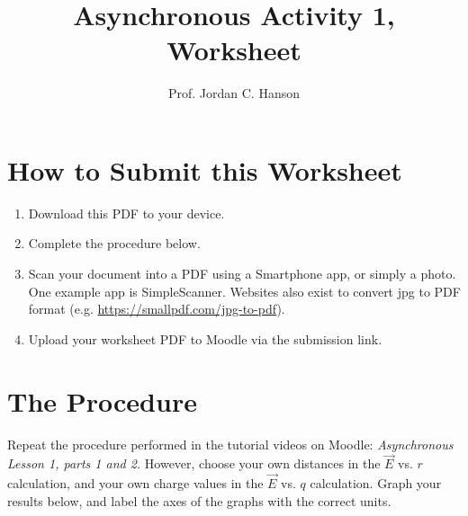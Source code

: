 \documentclass{article}
\begin{document}
\title{Asynchronous Activity 1, Worksheet}
\author{Prof. Jordan C. Hanson}

\maketitle

\section{How to Submit this Worksheet}

\begin{enumerate}
\item Download this PDF to your device.
\item Complete the procedure below.
\item Scan your document into a PDF using a Smartphone app, or simply a photo.  One example app is SimpleScanner.  Websites also exist to convert jpg to PDF format (e.g. \url{https://smallpdf.com/jpg-to-pdf}).
\item Upload your worksheet PDF to Moodle via the submission link.
\end{enumerate}

\section{The Procedure}

Repeat the procedure performed in the tutorial videos on Moodle: \textit{Asynchronous Lesson 1, parts 1 and 2.}  However, choose your own distances in the $\vec{E}$ vs. $r$ calculation, and your own charge values in the $\vec{E}$ vs. $q$ calculation.  Graph your results below, and label the axes of the graphs with the correct units. \\ \vspace{5cm}
\end{document}

